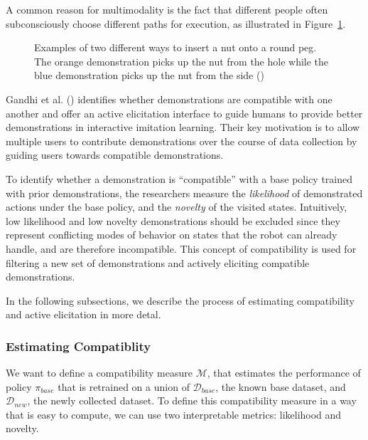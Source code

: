 \documentclass[
  letterpaper,
  numbers=noenddot,
  DIV=11]{scrreprt}
\theoremstyle{plain}
\theoremstyle{definition}
\theoremstyle{plain}
\theoremstyle{remark}
\begin{document}
A common reason for multimodality is the fact that different people
often subconsciously choose different paths for execution, as
illustrated in Figure~\ref{fig-multimodalexecution}.

\begin{figure}


\caption{\label{fig-multimodalexecution}Examples of two different ways
to insert a nut onto a round peg. The orange demonstration picks up the
nut from the hole while the blue demonstration picks up the nut from the
side ()}

\end{figure}%

Gandhi et al. ()
identifies whether demonstrations are compatible with one another and
offer an active elicitation interface to guide humans to provide better
demonstrations in interactive imitation learning. Their key motivation
is to allow multiple users to contribute demonstrations over the course
of data collection by guiding users towards compatible demonstrations.

To identify whether a demonstration is ``compatible'' with a base policy
trained with prior demonstrations, the researchers measure the
\emph{likelihood} of demonstrated actions under the base policy, and the
\emph{novelty} of the visited states. Intuitively, low likelihood and
low novelty demonstrations should be excluded since they represent
conflicting modes of behavior on states that the robot can already
handle, and are therefore incompatible. This concept of compatibility is
used for filtering a new set of demonstrations and actively eliciting
compatible demonstrations.

In the following subsections, we describe the process of estimating
compatibility and active elicitation in more detal.

\subsubsection*{Estimating Compatiblity}\label{estimating-compatiblity}

We want to define a compatibility measure \(\mathcal{M}\), that
estimates the performance of policy \(\pi_{base}\) that is retrained on
a union of \(\mathcal{D}_{base}\), the known base dataset, and
\(\mathcal{D}_{new}\), the newly collected dataset. To define this
compatibility measure in a way that is easy to compute, we can use two
interpretable metrics: likelihood and novelty.
\end{document}
